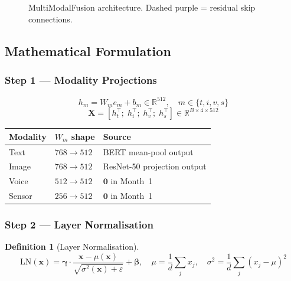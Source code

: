 \documentclass[12pt, a4paper]{article}
\theoremstyle{definition}
\newtheorem{definition}{Definition}[section]
\theoremstyle{plain}
\theoremstyle{remark}
\begin{document}
\begin{figure}[H]
\caption{MultiModalFusion architecture.  Dashed purple = residual skip connections.}
\label{fig:fusion_arch}
\end{figure}

\subsection{Mathematical Formulation}

\subsubsection{Step 1 --- Modality Projections}

\[
  h_m = W_m e_m + b_m \in \mathbb{R}^{512},\quad m\in\{t,i,v,s\}
\]
\[
  \mathbf{X} = [h_t^\top;\; h_i^\top;\; h_v^\top;\; h_s^\top]
  \in \mathbb{R}^{B\times 4\times 512}
\]

\begin{center}
\begin{tabular}{@{}lll@{}}
\toprule
\textbf{Modality} & $W_m$ shape & \textbf{Source} \\
\midrule
Text   & $768\to512$ & BERT mean-pool output \\
Image  & $768\to512$ & ResNet-50 projection output \\
Voice  & $512\to512$ & $\mathbf{0}$ in Month~1 \\
Sensor & $256\to512$ & $\mathbf{0}$ in Month~1 \\
\bottomrule
\end{tabular}
\end{center}

\subsubsection{Step 2 --- Layer Normalisation}

\begin{definition}[Layer Normalisation]
\[
  \mathrm{LN}(\mathbf{x}) = \bm{\gamma}\cdot
  \frac{\mathbf{x} - \mu(\mathbf{x})}{\sqrt{\sigma^2(\mathbf{x})+\varepsilon}}
  + \bm{\beta},\quad
  \mu = \frac{1}{d}\sum_j x_j,\quad
  \sigma^2 = \frac{1}{d}\sum_j(x_j-\mu)^2
\]
\end{definition}
\end{document}
